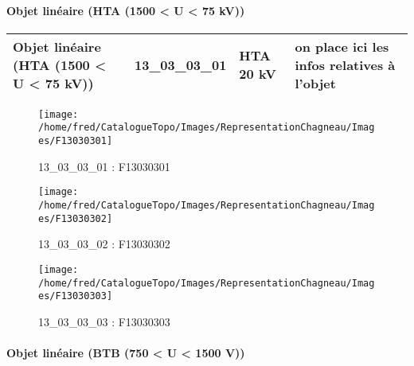 \documentclass[12pt,titlepage,oneside]{book}
\begin{document}
\paragraph{Objet linéaire (HTA (1500 < U < 75 kV))}
\noindent
\vspace{\baselineskip}

\renewcommand{\arraystretch}{1.2}
\begin{supertabular}{|p{10cm}|c|p{13cm}|p{12cm}|}
 Objet linéaire (HTA (1500 < U < 75 kV)) & 13\_03\_03\_01 & HTA 20 kV & on place ici les infos relatives à l'objet\\
\hline
\end{supertabular}
\begin{figure}[h!]
  \hfill         %
  \begin{minipage}[t]{3cm}
    \begin{center}
      \texttt{[image: /home/fred/CatalogueTopo/Images/RepresentationChagneau/Images/F13030301]}
      \caption[F13030301]{\label{} 13\_03\_03\_01 : F13030301}
    \end{center}
  \end{minipage}
  \begin{minipage}[t]{3cm}
    \begin{center}
      \texttt{[image: /home/fred/CatalogueTopo/Images/RepresentationChagneau/Images/F13030302]}
      \caption[F13030302]{\label{} 13\_03\_03\_02 : F13030302}
    \end{center}
  \end{minipage}
  \begin{minipage}[t]{3cm}
    \begin{center}
      \texttt{[image: /home/fred/CatalogueTopo/Images/RepresentationChagneau/Images/F13030303]}
      \caption[F13030303]{\label{} 13\_03\_03\_03 : F13030303}
    \end{center}
  \end{minipage}
\end{figure}


\paragraph{Objet linéaire (BTB (750 < U < 1500 V))}
\noindent
\vspace{\baselineskip}
\end{document}

